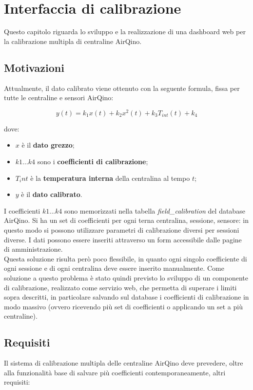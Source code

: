 \chapter{Interfaccia di calibrazione}\label{ch:interfaccia}
Questo capitolo riguarda lo sviluppo e la realizzazione di una dashboard web per la calibrazione multipla di centraline AirQino.

\section{Motivazioni}\label{sec:motivazioni}
Attualmente, il dato calibrato viene ottenuto con la seguente formula, fissa per tutte le centraline e sensori AirQino:

$$y(t)=k_{1} x(t)+k_{2} x^{2}(t)+k_{3} T_{int}(t)+k_{4}$$\smallskip

dove:

\begin{itemize}
  \item $x$ è il \textbf{dato grezzo};
  \item $k1...k4$ sono i \textbf{coefficienti di calibrazione};
  \item $T_int$ è la \textbf{temperatura interna} della centralina al tempo $t$;
  \item $y$ è il \textbf{dato calibrato}.
\end{itemize}

I coefficienti $k1...k4$ sono memorizzati nella tabella \textit{field\_calibration} del database AirQino. Si ha
un set di coefficienti per ogni terna centralina, sessione, sensore: in questo modo si possono utilizzare parametri di calibrazione diversi per sessioni diverse. I dati possono essere inseriti attraverso un form accessibile dalle pagine di amministrazione.\\

Questa soluzione risulta però poco flessibile, in quanto ogni singolo coefficiente di ogni sessione e di ogni centralina deve essere inserito manualmente. Come soluzione a questo problema è stato quindi previsto lo sviluppo di un componente di calibrazione, realizzato come servizio web, che permetta di superare i limiti sopra descritti, in particolare salvando sul database i coefficienti di calibrazione in modo massivo (ovvero ricevendo più set di coefficienti o applicando un set a più centraline).

\section{Requisiti}\label{sec:requisiti}
Il sistema di calibrazione multipla delle centraline AirQino deve prevedere, oltre alla funzionalità base di salvare più coefficienti contemporaneamente, altri requisiti:

